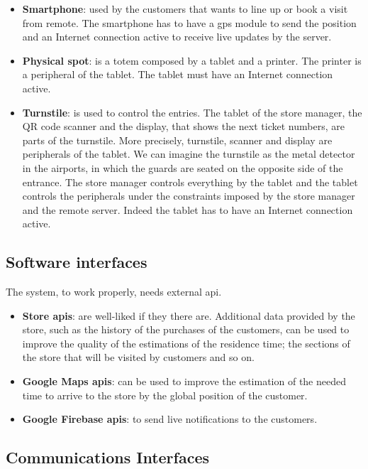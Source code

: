 \begin{itemize}
    \item \textbf{Smartphone}: used by the customers that wants to line up or book a visit from remote. The smartphone has to have a \gls{gps} module to send the position and an Internet connection active to receive live updates by the server.
    \item \textbf{Physical spot}: is a totem composed by a tablet and a printer. The printer is a peripheral of the tablet. The tablet must have an Internet connection active.
    \item \textbf{Turnstile}: is used to control the entries. The tablet of the store manager, the QR code scanner and the display, that shows the next ticket numbers, are parts of the turnstile. More precisely, turnstile, scanner and display are peripherals of the tablet.
    We can imagine the turnstile as the metal detector in the airports, in which the guards are seated on the opposite side of the entrance.
    The store manager controls everything by the tablet and the tablet controls the peripherals under the constraints imposed by the store manager and the remote server.
    Indeed the tablet has to have an Internet connection active.
\end{itemize}

\subsection{Software interfaces}

The system, to work properly, needs external \gls{api}.

\begin{itemize}
    \item \textbf{Store \glspl{api}}: are well-liked if they there are. Additional data provided by the store, such as the history of the purchases of the customers, can be used to improve the quality of the estimations of the residence time; the sections of the store that will be visited by customers and so on.
    \item \textbf{Google Maps \glspl{api}}: can be used to improve the estimation of the needed time to arrive to the store by the global position of the customer.
    \item \textbf{Google Firebase \glspl{api}}: to send live notifications to the customers.
\end{itemize}

\subsection{Communications Interfaces}

